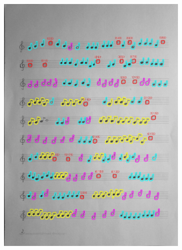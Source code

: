 \documentclass[11pt]{article}
\begin{document}
\begin{figure}[H]
\begin{subfigure}{.5\textwidth}
        \includegraphics[width=\linewidth]{10_cnts.jpg}
        \label{fig:sub2}
    \end{subfigure}
    \label{fig:test}
\end{figure}
\end{document}
